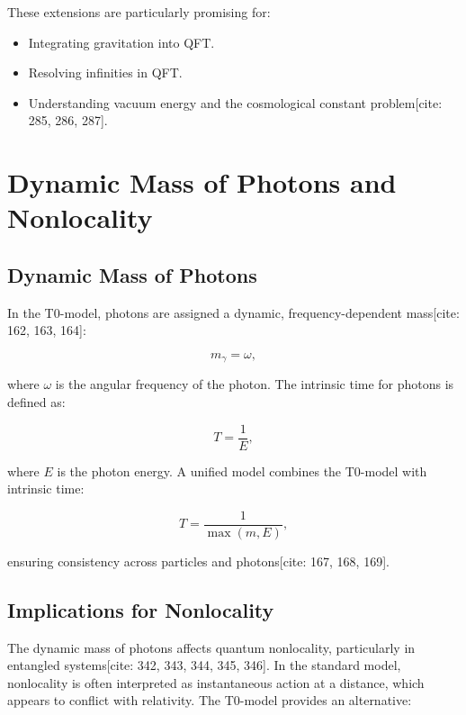 \documentclass[a4paper,12pt]{article}
\theoremstyle{definition}
\theoremstyle{remark}
\begin{document}
	These extensions are particularly promising for:
	
	\begin{itemize}
		\item Integrating gravitation into QFT.
		\item Resolving infinities in QFT.
		\item Understanding vacuum energy and the cosmological constant problem[cite: 285, 286, 287].
	\end{itemize}
	
	\section{Dynamic Mass of Photons and Nonlocality}
	
	\subsection{Dynamic Mass of Photons}
	
	In the T0-model, photons are assigned a dynamic, frequency-dependent mass[cite: 162, 163, 164]:
	
	\begin{equation}
		m_\gamma = \omega,
	\end{equation}
	
	where \(\omega\) is the angular frequency of the photon. The intrinsic time for photons is defined as:
	
	\begin{equation}
		T = \frac{1}{E},
	\end{equation}
	
	where \( E \) is the photon energy. A unified model combines the T0-model with intrinsic time:
	
	\begin{equation}
		T = \frac{1}{\max(m, E)},
	\end{equation}
	
	ensuring consistency across particles and photons[cite: 167, 168, 169].
	
	\subsection{Implications for Nonlocality}
	
	The dynamic mass of photons affects quantum nonlocality, particularly in entangled systems[cite: 342, 343, 344, 345, 346]. In the standard model, nonlocality is often interpreted as instantaneous action at a distance, which appears to conflict with relativity. The T0-model provides an alternative:
	
\end{document}
